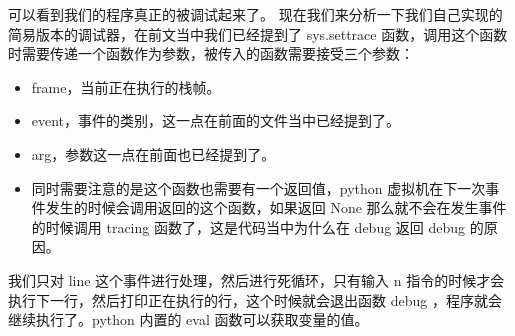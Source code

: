 可以看到我们的程序真正的被调试起来了。
现在我们来分析一下我们自己实现的简易版本的调试器，在前文当中我们已经提到了 sys.settrace 函数，调用这个函数时需要传递一个函数作为参数，被传入的函数需要接受三个参数：
\begin{itemize}
\item frame，当前正在执行的栈帧。 
\item event，事件的类别，这一点在前面的文件当中已经提到了。 
\item arg，参数这一点在前面也已经提到了。 
\item 同时需要注意的是这个函数也需要有一个返回值，python 虚拟机在下一次事件发生的时候会调用返回的这个函数，如果返回 None  那么就不会在发生事件的时候调用 tracing 函数了，这是代码当中为什么在 debug 返回 debug 的原因。 
\end{itemize}
我们只对 line 这个事件进行处理，然后进行死循环，只有输入 n 指令的时候才会执行下一行，然后打印正在执行的行，这个时候就会退出函数 debug ，程序就会继续执行了。python 内置的 eval 函数可以获取变量的值。
